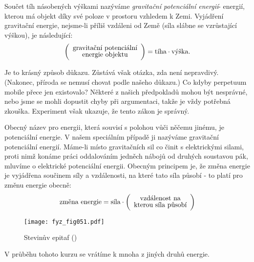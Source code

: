     Součet tíh násobených výškami nazýváme \emph{gravitační potenciální energií}- energií, kterou 
    má objekt díky své poloze v prostoru vzhledem k Zemi. Vyjádření gravitační energie, nejsme-li 
    příliš vzdáleni od Země (síla slábne se vzrůstající výškou), je následující:
    \begin{equation}\label{FYZ:eq056}
      \renewcommand{\arraystretch}{0.8}
      \left(
        \begin{array}{c}
          \text{gravitační potenciální}  \\
          \text{energie objektu}
        \end{array}
      \right) =
      \text{tíha} \cdot \text{výška}.
    \end{equation}

    Je to krásný způsob důkazu. Zůstává však otázka, zda není nepravdivý. (Nakonec, příroda se 
    nemusí chovat podle našeho důkazu.) Co kdyby perpetuum mobile přece jen existovalo? Některé z 
    našich předpokladů mohou být nesprávné, nebo jsme se mohli dopustit chyby při argumentaci, 
    takže je vždy potřebná zkouška. Experiment však ukazuje, že tento zákon je správný.
    
    Obecný název pro energii, která souvisí s polohou vůči něčemu jinému, je potenciální energie. V 
    našem speciálním případě ji nazýváme gravitační potenciální energií. Máme-li místo gravitačních 
    sil co činit s elektrickými silami, proti nimž konáme práci oddalováním jedněch nábojů od 
    druhých soustavou pák, mluvíme o elektrické potenciální energii. Obecným principem je, že změna 
    energie je vyjádřena součinem síly a vzdálenosti, na které tato síla působí - to platí pro 
    změnu energie obecně:
    \begin{equation}\label{FYZ:eq057}
      \renewcommand{\arraystretch}{0.8}
      \text{změna energie} = 
      \text{síla} \cdot
      \left(
        \begin{array}{c}
          \text{vzdálenost na}  \\
          \text{kterou síla působí}
        \end{array}
      \right)
    \end{equation}

    \begin{wrapfigure}[12]{r}{5cm}  %
      \centering
      \texttt{[image: fyz\_fig051.pdf]}
      \caption{Stevinův epitaf (\cite[s.~55]{Feynman01})}
      \label{fyz:fig051}
    \end{wrapfigure}
    V průběhu tohoto kurzu se vrátíme k mnoha z jiných druhů energie.

